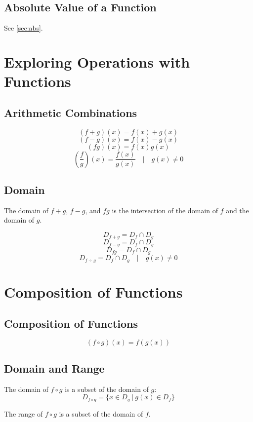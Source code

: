 		\subsection{Absolute Value of a Function}
			See \ref{sec:abs}.
	\section{Exploring Operations with Functions}
		\subsection{Arithmetic Combinations}
			\[(f+g)(x)=f(x)+g(x)\]
			\[(f-g)(x)=f(x)-g(x)\]
			\[(fg)(x)=f(x)g(x)\]
			\[\left(\frac{f}{g}\right)(x)=\frac{f(x)}{g(x)} \quad | \quad g(x) \neq 0\]
		\subsection{Domain}
			The domain of $f+g$, $f-g$, and $fg$ is the intersection of the domain of $f$ and the domain of $g$.

			\[D_{f+g} = D_f \cap D_g\]
			\[D_{f-g} = D_f \cap D_g\]
			\[D_{fg} = D_f \cap D_g\]
			\[D_{f \div g} = D_f \cap D_g \quad | \quad g(x) \neq 0\]
	\section{Composition of Functions}
		\subsection{Composition of Functions}
			\[(f \circ g)(x) = f(g(x))\]
		\subsection{Domain and Range}
			The domain of $f \circ g$ is a subset of the domain of $g$:
			\[D_{f \circ g} = \{x \in D_g\ |\ g(x) \in D_f\}\]

			The range of $f \circ g$ is a subset of the domain of $f$.
